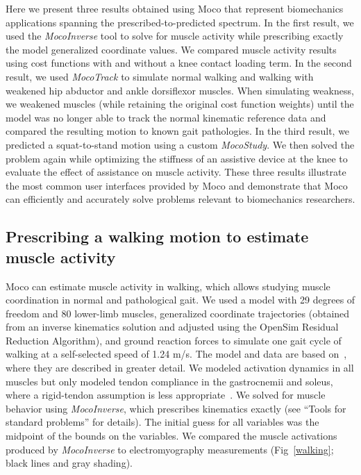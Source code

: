 \documentclass[10pt,letterpaper]{article}
\begin{document}
Here we present three results obtained using Moco that represent biomechanics applications spanning the prescribed-to-predicted spectrum. In the first result, we used the \textit{MocoInverse} tool to solve for muscle activity while prescribing exactly the model generalized coordinate values. We compared muscle activity results using cost functions with and without a knee contact loading term. In the second result, we used \textit{MocoTrack} to simulate normal walking and walking with weakened hip abductor and ankle dorsiflexor muscles. When simulating weakness, we weakened muscles (while retaining the original cost function weights) until the model was no longer able to track the normal kinematic reference data and compared the resulting motion to known gait pathologies. In the third result, we predicted a squat-to-stand motion using a custom \textit{MocoStudy}. We then solved the problem again while optimizing the stiffness of an assistive device at the knee to evaluate the effect of assistance on muscle activity. These three results illustrate the most common user interfaces provided by Moco and demonstrate that Moco can efficiently and accurately solve problems relevant to biomechanics researchers.

\subsection*{Prescribing a walking motion to estimate muscle activity}

Moco can estimate muscle activity in walking, which allows studying muscle coordination in normal and pathological gait. We used a model with 29 degrees of freedom and 80 lower-limb muscles, generalized coordinate trajectories (obtained from an inverse kinematics solution and adjusted using the OpenSim Residual Reduction Algorithm), and ground reaction forces to simulate one gait cycle of walking at a self-selected speed of 1.24 m/s. The model and data are based on~\cite{Rajagopal:2016ek}, where they are described in greater detail. We modeled activation dynamics in all muscles but only modeled tendon compliance in the gastrocnemii and soleus, where a rigid-tendon assumption is less appropriate~\cite{Groote:2016dq}. We solved for muscle behavior using \textit{MocoInverse}, which prescribes kinematics exactly (see ``Tools for standard problems'' for details). The initial guess for all variables was the midpoint of the bounds on the variables. We compared the muscle activations produced by \textit{MocoInverse} to electromyography measurements (Fig~\ref{walking}; black lines and gray shading).
\end{document}
